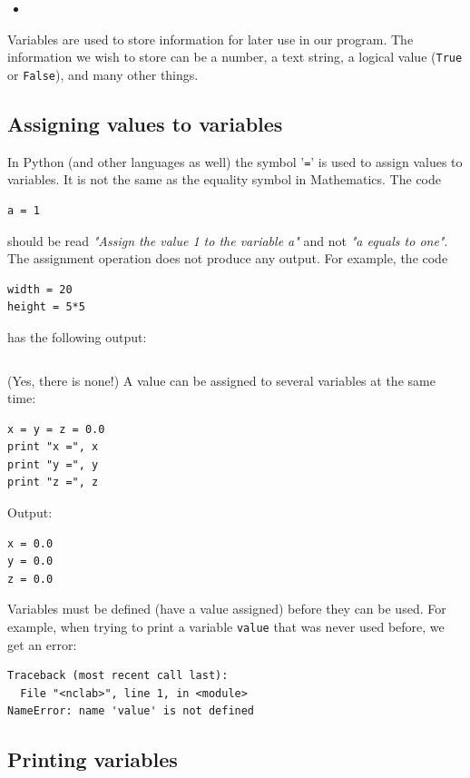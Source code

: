 \documentclass[article,A4,12pt]{llncs}
\begin{document}
\begin{itemize}
\item
\end{itemize}


Variables are used to store information for later use in our program. The information
we wish to store can be a number, a text string, a logical value ({\tt True} or {\tt False}),
and many other things. 

\subsection{Assigning values to variables}

In Python (and other languages as well) the symbol '{\tt =}' is used to assign 
values to variables. It is not the same as the equality symbol in Mathematics. 
The code

\begin{verbatim}
a = 1
\end{verbatim}
should be read {\em "Assign the value 1 to the variable a"} and not {\em "a equals to one"}.
The assignment operation does not produce any output. For example, the code

\begin{verbatim}
width = 20
height = 5*5
\end{verbatim}
has the following output:

\begin{verbatim}

\end{verbatim}
(Yes, there is none!) A value can be assigned to several variables at the same time:

\begin{verbatim}
x = y = z = 0.0
print "x =", x
print "y =", y
print "z =", z
\end{verbatim}
Output:

\begin{verbatim}
x = 0.0
y = 0.0
z = 0.0
\end{verbatim}
Variables must be defined (have a value assigned) before they can be 
used. For example, when trying to print a variable {\tt value} that 
was never used before, we get an error:

\begin{verbatim}
Traceback (most recent call last):
  File "<nclab>", line 1, in <module>
NameError: name 'value' is not defined
\end{verbatim}

\subsection{Printing variables}
\end{document}
